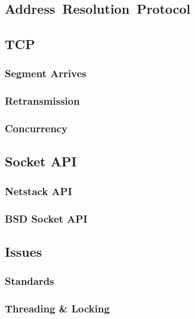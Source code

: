     \subsection{\mbox{Address Resolution Protocol}}

    \subsection{TCP}
        \subsubsection{Segment Arrives}
        \subsubsection{Retransmission}
        \subsubsection{Concurrency}

    \subsection{Socket API}
        \subsubsection{Netstack API}
        \subsubsection{BSD Socket API}

    \subsection{Issues}
        \subsubsection{Standards}
        \subsubsection{Threading \& Locking}



